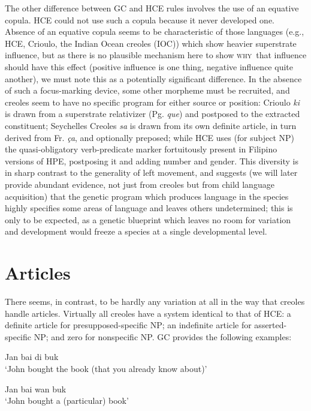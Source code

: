 The other difference between GC and HCE rules involves the use of an equative copula. HCE could not use such a copula because it never developed one. Absence of an equative copula seems to be characteristic of those languages (e.g., HCE, Crioulo, the Indian Ocean creoles (IOC)) which show heavier superstrate influence, but as there is no plausible mechanism here to show \textsc{why}~that influence should have this effect (positive influence is one thing, negative influence quite
another), we must note this as a potentially significant difference. In the absence of such a focus-marking device, some other morpheme must be recruited, and creoles seem to have no specific program for either source or position: Crioulo \textit{ki} is drawn from a superstrate rela\-tivizer (Pg. \textit{que}) and postposed to the extracted constituent; Seychelles Creoles \textit{sa} is drawn from its own definite article, in turn derived from Fr. \textit{ça}, and optionally preposed; while HCE uses (for subject NP) the quasi-obligatory verb-predicate marker fortuitously present in Filipino versions of HPE, postposing it and adding number and gender. This diversity is in sharp contrast to the generality of left movement, and suggests (we will later provide abundant evidence, not just from creoles but from child language acquisition) that the genetic program which produces language in the species highly specifies some areas of language and leaves others undetermined; this is only to be expected, as a genetic blueprint which leaves no room for variation and development would freeze a species at a single developmental level.

\section{Articles}

There seems, in contrast, to be hardly any variation at all in the way that creoles handle articles. Virtually all creoles have a system identical to that of HCE: a definite article for presupposed-specific NP; an indefinite article for asserted-specific NP; and zero for nonspecific NP. GC provides the following examples:


\ea\label{ex:2:13}
Jan bai di buk\\
\glt `John bought the book (that you already know about)'
\z

\ea\label{ex:2:14}
 Jan bai wan buk\\
\glt `John bought a (particular) book'
\z


